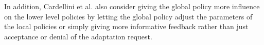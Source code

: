         \quad In addition, Cardellini et al. also consider giving the global policy more influence on the lower level policies by letting the 
        global policy adjust the parameters of the local policies or simply giving more informative feedback rather than just acceptance or denial of the adaptation request.



